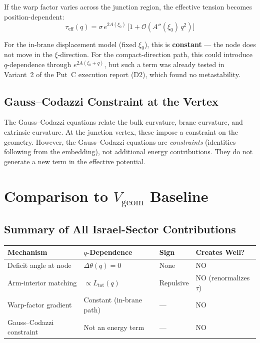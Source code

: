 If the warp factor varies across the junction region, the effective
tension becomes position-dependent:
\begin{equation}
    \tau_{\mathrm{eff}}(q) = \sigma\, e^{2A(\xi_0)}\,
    \bigl[1 + \mathcal{O}(A''(\xi_0)\, q^2)\bigr]
\end{equation}

For the in-brane displacement model (fixed $\xi_0$), this is
\textbf{constant} --- the node does not move in the $\xi$-direction.
For the compact-direction path, this could introduce $q$-dependence
through $e^{2A(\xi_0 + q)}$, but such a term was already tested in
Variant~2 of the Put~C execution report (D2), which found no
metastability.

\subsection{Gauss--Codazzi Constraint at the Vertex}

The Gauss--Codazzi equations relate the bulk curvature, brane
curvature, and extrinsic curvature. At the junction vertex, these
impose a constraint on the geometry. However, the Gauss--Codazzi
equations are \emph{constraints} (identities following from the
embedding), not additional energy contributions. They do not generate
a new term in the effective potential.

\section{Comparison to $V_{\mathrm{geom}}$ Baseline}
\label{sec:P2WP2:comparison}

\subsection{Summary of All Israel-Sector Contributions}

\begin{center}
\begin{tabular}{llll}
\toprule
\textbf{Mechanism} & \textbf{$q$-Dependence} & \textbf{Sign}
& \textbf{Creates Well?} \\
\midrule
Deficit angle at node & $\Delta\theta(q) = 0$ & None & NO \\
Arm-interior matching & $\propto L_{\mathrm{tot}}(q)$ & Repulsive
& NO (renormalizes $\tau$) \\
Warp-factor gradient & Constant (in-brane path) & --- & NO \\
Gauss--Codazzi constraint & Not an energy term & --- & NO \\
\bottomrule
\end{tabular}
\end{center}

